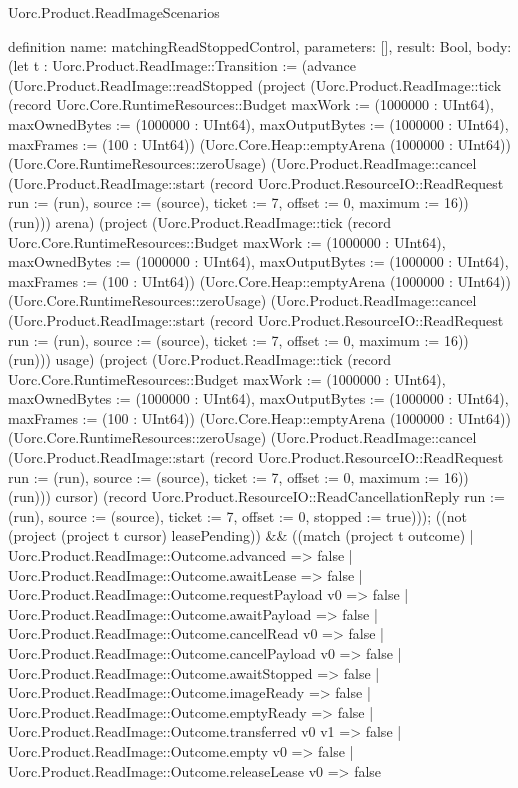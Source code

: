 \begin{lexlean}{Uorc.Product.ReadImageScenarios}
\begin{semanticmodule}
definition{
  name: matchingReadStoppedControl,
  parameters: [],
  result: Bool,
  body: (let t : Uorc.Product.ReadImage::Transition := (advance (Uorc.Product.ReadImage::readStopped (project (Uorc.Product.ReadImage::tick (record Uorc.Core.RuntimeResources::Budget {maxWork := (1000000 : UInt64), maxOwnedBytes := (1000000 : UInt64), maxOutputBytes := (1000000 : UInt64), maxFrames := (100 : UInt64)}) (Uorc.Core.Heap::emptyArena (1000000 : UInt64)) (Uorc.Core.RuntimeResources::zeroUsage) (Uorc.Product.ReadImage::cancel (Uorc.Product.ReadImage::start (record Uorc.Product.ResourceIO::ReadRequest {run := (run), source := (source), ticket := 7, offset := 0, maximum := 16})) (run))) arena) (project (Uorc.Product.ReadImage::tick (record Uorc.Core.RuntimeResources::Budget {maxWork := (1000000 : UInt64), maxOwnedBytes := (1000000 : UInt64), maxOutputBytes := (1000000 : UInt64), maxFrames := (100 : UInt64)}) (Uorc.Core.Heap::emptyArena (1000000 : UInt64)) (Uorc.Core.RuntimeResources::zeroUsage) (Uorc.Product.ReadImage::cancel (Uorc.Product.ReadImage::start (record Uorc.Product.ResourceIO::ReadRequest {run := (run), source := (source), ticket := 7, offset := 0, maximum := 16})) (run))) usage) (project (Uorc.Product.ReadImage::tick (record Uorc.Core.RuntimeResources::Budget {maxWork := (1000000 : UInt64), maxOwnedBytes := (1000000 : UInt64), maxOutputBytes := (1000000 : UInt64), maxFrames := (100 : UInt64)}) (Uorc.Core.Heap::emptyArena (1000000 : UInt64)) (Uorc.Core.RuntimeResources::zeroUsage) (Uorc.Product.ReadImage::cancel (Uorc.Product.ReadImage::start (record Uorc.Product.ResourceIO::ReadRequest {run := (run), source := (source), ticket := 7, offset := 0, maximum := 16})) (run))) cursor) (record Uorc.Product.ResourceIO::ReadCancellationReply {run := (run), source := (source), ticket := 7, offset := 0, stopped := true}))); ((not (project (project t cursor) leasePending)) && ((match (project t outcome)
    | Uorc.Product.ReadImage::Outcome.advanced => false
    | Uorc.Product.ReadImage::Outcome.awaitLease => false
    | Uorc.Product.ReadImage::Outcome.requestPayload v0 => false
    | Uorc.Product.ReadImage::Outcome.awaitPayload => false
    | Uorc.Product.ReadImage::Outcome.cancelRead v0 => false
    | Uorc.Product.ReadImage::Outcome.cancelPayload v0 => false
    | Uorc.Product.ReadImage::Outcome.awaitStopped => false
    | Uorc.Product.ReadImage::Outcome.imageReady => false
    | Uorc.Product.ReadImage::Outcome.emptyReady => false
    | Uorc.Product.ReadImage::Outcome.transferred v0 v1 => false
    | Uorc.Product.ReadImage::Outcome.empty v0 => false
    | Uorc.Product.ReadImage::Outcome.releaseLease v0 => false
}
\end{semanticmodule}
\end{lexlean}
